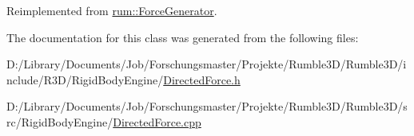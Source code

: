 Reimplemented from \mbox{\hyperlink{classrum_1_1_force_generator_aee5f1dc03ba285b5122fa2a8ba790230}{rum\+::\+Force\+Generator}}.



The documentation for this class was generated from the following files\+:\begin{DoxyCompactItemize}
\item 
D\+:/\+Library/\+Documents/\+Job/\+Forschungsmaster/\+Projekte/\+Rumble3\+D/\+Rumble3\+D/include/\+R3\+D/\+Rigid\+Body\+Engine/\mbox{\hyperlink{_directed_force_8h}{Directed\+Force.\+h}}\item 
D\+:/\+Library/\+Documents/\+Job/\+Forschungsmaster/\+Projekte/\+Rumble3\+D/\+Rumble3\+D/src/\+Rigid\+Body\+Engine/\mbox{\hyperlink{_directed_force_8cpp}{Directed\+Force.\+cpp}}\end{DoxyCompactItemize}
